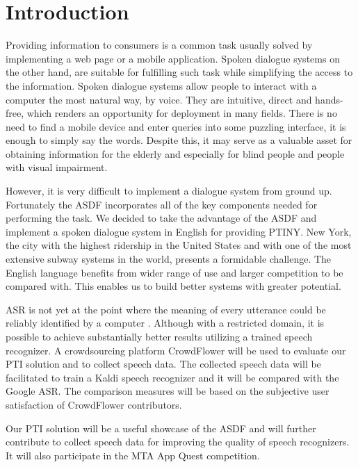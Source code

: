 

\chapter*{Introduction}

Providing information to consumers is a common task usually solved by implementing a web page or a mobile application.
Spoken dialogue systems on the other hand, are suitable for fulfilling such task while simplifying the access to the information.
Spoken dialogue systems allow people to interact with a computer the most natural way, by voice.
They are intuitive, direct and hands-free, which renders an opportunity for deployment in many fields.
There is no need to find a mobile device and enter queries into some puzzling interface, it is enough to simply say the words.
Despite this, it may serve as a valuable asset for obtaining information for the elderly and especially for blind people and people with visual impairment. %

However, it is very difficult to implement a dialogue system from ground up.
Fortunately the \acf{ASDF}\cite{asdf} incorporates all of the key components needed for performing the task.
We decided to take the advantage of the \ac{ASDF} and implement a spoken dialogue system in English for providing \acf{PTINY}.
New York, the city with the highest ridership in the United States and with one of the most extensive subway systems in the world, presents a formidable challenge.
The English language benefits from wider range of use and larger competition to be compared with.
This enables us to build better systems with greater potential.

\acf{ASR} is not yet at the point where the meaning of every utterance could be reliably identified by a computer \cite{asr}.
Although with a restricted domain, it is possible to achieve substantially better results utilizing a trained speech recognizer.
A crowdsourcing platform CrowdFlower will be used to evaluate our \ac{PTI} solution and to collect speech data.
The collected speech data will be facilitated to train a Kaldi speech recognizer and it will be compared with the Google \ac{ASR}.
The comparison measures will be based on the subjective user satisfaction of CrowdFlower contributors. %

Our \ac{PTI} solution will be a useful showcase of the \ac{ASDF} and will further contribute to collect speech data for improving the quality of speech recognizers. It will also participate in the \ac{MTA} App Quest competition.

